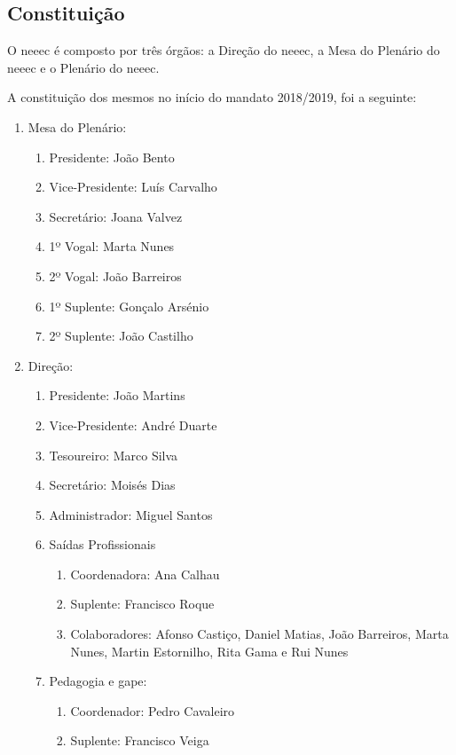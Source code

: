 
\subsection{Constituição}

O \acrshort{neeec} é composto por três órgãos: a Direção do \acrshort{neeec}, a Mesa do Plenário do \acrshort{neeec} e o Plenário do \acrshort{neeec}.

A constituição dos mesmos no início do mandato 2018/2019, foi a seguinte:
\begin{enumerate}
\item Mesa do Plenário:
  \begin{enumerate}
  \item Presidente: João Bento
  \item Vice-Presidente: Luís Carvalho
  \item Secretário: Joana Valvez
  \item 1º Vogal: Marta Nunes
  \item 2º Vogal: João Barreiros
  \item 1º Suplente: Gonçalo Arsénio
  \item 2º Suplente: João Castilho
  \end{enumerate}
\item Direção:
  \begin{enumerate}
  \item Presidente: João Martins
  \item Vice-Presidente: André Duarte
  \item Tesoureiro: Marco Silva
  \item Secretário: Moisés Dias
  \item Administrador: Miguel Santos
  \item Saídas Profissionais
    \begin{enumerate}
    \item Coordenadora: Ana Calhau
    \item Suplente: Francisco Roque
    \item Colaboradores: Afonso Castiço, Daniel Matias, João Barreiros, Marta Nunes, Martin Estornilho, Rita Gama e Rui Nunes
    \end{enumerate}
  \item Pedagogia e \acrshort{gape}:
    \begin{enumerate}
    \item Coordenador: Pedro Cavaleiro
    \item Suplente: Francisco Veiga

\end{enumerate}
\end{enumerate}
\end{enumerate}
